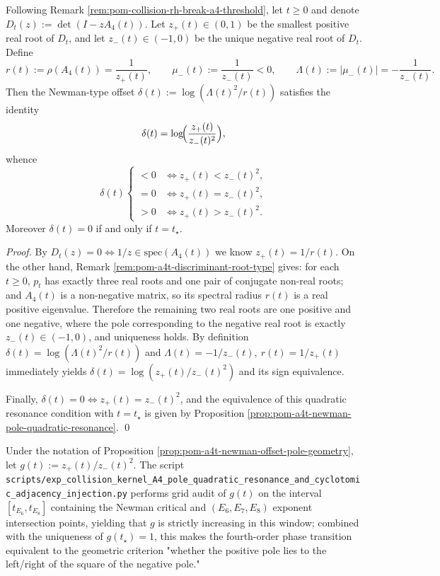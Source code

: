 \begin{proposition}[Kernel-Version Newman Offset Pole Geometry Criterion: \texorpdfstring{$\delta(t)=\log(z_+(t)/z_-(t)^2)$}{delta(t)=log(z+/z-^2)}]\label{prop:pom-a4t-newman-offset-pole-geometry}
Following Remark \ref{rem:pom-collision-rh-break-a4-threshold}, let \(t\ge 0\) and denote
\(
D_t(z):=\det(I-zA_4(t))
\).
Let \(z_+(t)\in(0,1)\) be the smallest positive real root of \(D_t\), and let \(z_-(t)\in(-1,0)\) be the unique negative real root of \(D_t\).
Define
\[
r(t):=\rho(A_4(t))=\frac{1}{z_+(t)},\qquad
\mu_-(t):=\frac{1}{z_-(t)}<0,\qquad
\Lambda(t):=|\mu_-(t)|=-\frac{1}{z_-(t)}.
\]
Then the Newman-type offset \(\delta(t):=\log(\Lambda(t)^2/r(t))\) satisfies the identity
\[
\delta(t)=\log\!\Bigl(\frac{z_+(t)}{z_-(t)^2}\Bigr),
\]
whence
\[
\delta(t)\begin{cases}
<0 &\Longleftrightarrow z_+(t)<z_-(t)^2,\\
=0 &\Longleftrightarrow z_+(t)=z_-(t)^2,\\
>0 &\Longleftrightarrow z_+(t)>z_-(t)^2.
\end{cases}
\]
Moreover \(\delta(t)=0\) if and only if \(t=t_\star\).
\end{proposition}
\begin{proof}
By \(D_t(z)=0\iff 1/z\in\mathrm{spec}(A_4(t))\) we know \(z_+(t)=1/r(t)\).
On the other hand, Remark \ref{rem:pom-a4t-discriminant-root-type} gives: for each \(t\ge 0\), \(p_t\) has exactly three real roots and one pair of conjugate non-real roots; and \(A_4(t)\) is a non-negative matrix, so its spectral radius \(r(t)\) is a real positive eigenvalue.
Therefore the remaining two real roots are one positive and one negative, where the pole corresponding to the negative real root is exactly \(z_-(t)\in(-1,0)\), and uniqueness holds.
By definition
\(
\delta(t)=\log(\Lambda(t)^2/r(t))
\)
and
\(
\Lambda(t)=-1/z_-(t),\ r(t)=1/z_+(t)
\)
immediately yields \(\delta(t)=\log(z_+(t)/z_-(t)^2)\) and its sign equivalence.
\par
Finally, \(\delta(t)=0\iff z_+(t)=z_-(t)^2\), and the equivalence of this quadratic resonance condition with \(t=t_\star\) is given by Proposition \ref{prop:pom-a4t-newman-pole-quadratic-resonance}. \qed
\end{proof}

\begin{remark}\label{rem:pom-a4t-pole-ratio-monotone-window}
Under the notation of Proposition \ref{prop:pom-a4t-newman-offset-pole-geometry}, let
\(
g(t):=z_+(t)/z_-(t)^2
\).
The script \texttt{scripts/exp\_collision\_kernel\_A4\_pole\_quadratic\_resonance\_and\_cyclotomic\_adjacency\_injection.py}
performs grid audit of \(g(t)\) on the interval \([t_{E_6},t_{E_8}]\) containing the Newman critical and \((E_6,E_7,E_8)\) exponent intersection points,
yielding that \(g\) is strictly increasing in this window; combined with the uniqueness of \(g(t_\star)=1\), this makes the fourth-order phase transition equivalent to the geometric criterion "whether the positive pole lies to the left/right of the square of the negative pole."
\end{remark}

